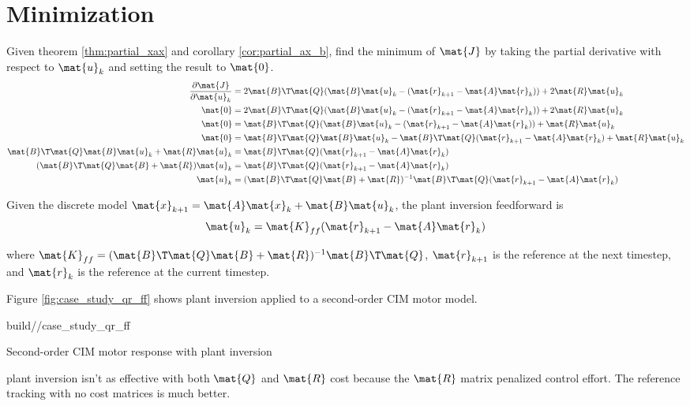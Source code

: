 \section{Minimization}

Given theorem \ref{thm:partial_xax} and corollary \ref{cor:partial_ax_b}, find
the minimum of $\mat{J}$ by taking the partial derivative with respect to
$\mat{u}_k$ and setting the result to $\mat{0}$.
\begin{align*}
  \frac{\partial\mat{J}}{\partial\mat{u}_k} &= 2\mat{B}\T\mat{Q}
    (\mat{B}\mat{u}_k - (\mat{r}_{k+1} - \mat{A}\mat{r}_k)) +
    2\mat{R}\mat{u}_k \\
  \mat{0} &= 2\mat{B}\T\mat{Q}
    (\mat{B}\mat{u}_k - (\mat{r}_{k+1} - \mat{A}\mat{r}_k)) +
    2\mat{R}\mat{u}_k \\
  \mat{0} &= \mat{B}\T\mat{Q}
    (\mat{B}\mat{u}_k - (\mat{r}_{k+1} - \mat{A}\mat{r}_k)) +
    \mat{R}\mat{u}_k \\
  \mat{0} &= \mat{B}\T\mat{Q}\mat{B}\mat{u}_k -
    \mat{B}\T\mat{Q}(\mat{r}_{k+1} - \mat{A}\mat{r}_k) + \mat{R}\mat{u}_k \\
  \mat{B}\T\mat{Q}\mat{B}\mat{u}_k + \mat{R}\mat{u}_k &=
    \mat{B}\T\mat{Q}(\mat{r}_{k+1} - \mat{A}\mat{r}_k) \\
  (\mat{B}\T\mat{Q}\mat{B} + \mat{R})\mat{u}_k &=
    \mat{B}\T\mat{Q}(\mat{r}_{k+1} - \mat{A}\mat{r}_k) \\
  \mat{u}_k &= (\mat{B}\T\mat{Q}\mat{B} + \mat{R})^{-1}
    \mat{B}\T\mat{Q}(\mat{r}_{k+1} - \mat{A}\mat{r}_k)
\end{align*}
\begin{theorem}
  Given the discrete model
  $\mat{x}_{k+1} = \mat{A}\mat{x}_k + \mat{B}\mat{u}_k$, the plant inversion
  feedforward is
  \begin{equation*}
    \mat{u}_k = \mat{K}_{ff} (\mat{r}_{k+1} - \mat{A}\mat{r}_k)
  \end{equation*}

  where
  $\mat{K}_{ff} = (\mat{B}\T\mat{Q}\mat{B} + \mat{R})^{-1}\mat{B}\T\mat{Q}$,
  $\mat{r}_{k+1}$ is the reference at the next timestep, and $\mat{r}_k$ is the
  reference at the current timestep.
\end{theorem}

Figure \ref{fig:case_study_qr_ff} shows \gls{plant} inversion applied to a
second-order CIM motor model.
\begin{svg}{build/\partpath/case_study_qr_ff}
  \caption{Second-order CIM motor response with plant inversion}
  \label{fig:case_study_qr_ff}
\end{svg}

\Gls{plant} inversion isn't as effective with both $\mat{Q}$ and $\mat{R}$ cost
because the $\mat{R}$ matrix penalized \gls{control effort}. The \gls{reference}
\gls{tracking} with no cost matrices is much better.
